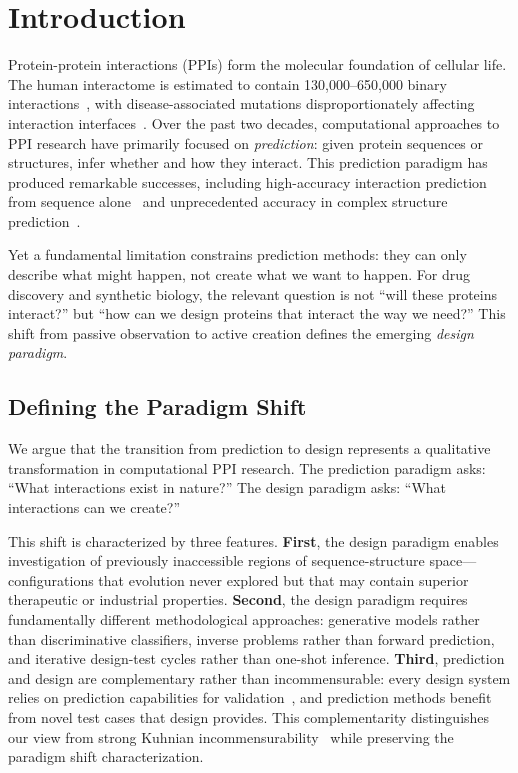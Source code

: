 \section{Introduction}
\label{sec:introduction}

Protein-protein interactions (PPIs) form the molecular foundation of cellular life. The human interactome is estimated to contain 130,000--650,000 binary interactions~\cite{szklarczyk2021string}, with disease-associated mutations disproportionately affecting interaction interfaces~\cite{sahni2015edgotype}. Over the past two decades, computational approaches to PPI research have primarily focused on \textit{prediction}: given protein sequences or structures, infer whether and how they interact. This prediction paradigm has produced remarkable successes, including high-accuracy interaction prediction from sequence alone~\cite{chen2019pipr,sledzieski2021dscript} and unprecedented accuracy in complex structure prediction~\cite{evans2022alphafoldmultimer,abramson2024alphafold3}.

Yet a fundamental limitation constrains prediction methods: they can only describe what might happen, not create what we want to happen. For drug discovery and synthetic biology, the relevant question is not ``will these proteins interact?'' but ``how can we design proteins that interact the way we need?'' This shift from passive observation to active creation defines the emerging \textit{design paradigm}.

\subsection*{Defining the Paradigm Shift}

We argue that the transition from prediction to design represents a qualitative transformation in computational PPI research. The prediction paradigm asks: ``What interactions exist in nature?'' The design paradigm asks: ``What interactions can we create?'' 

This shift is characterized by three features. \textbf{First}, the design paradigm enables investigation of previously inaccessible regions of sequence-structure space---configurations that evolution never explored but that may contain superior therapeutic or industrial properties. \textbf{Second}, the design paradigm requires fundamentally different methodological approaches: generative models rather than discriminative classifiers, inverse problems rather than forward prediction, and iterative design-test cycles rather than one-shot inference. \textbf{Third}, prediction and design are complementary rather than incommensurable: every design system relies on prediction capabilities for validation~\cite{watson2023rfdiffusion}, and prediction methods benefit from novel test cases that design provides. This complementarity distinguishes our view from strong Kuhnian incommensurability~\cite{kuhn1962structure} while preserving the paradigm shift characterization.

